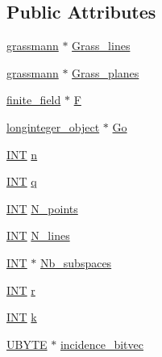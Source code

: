 \subsection*{Public Attributes}
\begin{DoxyCompactItemize}
\item 
\mbox{\hyperlink{classgrassmann}{grassmann}} $\ast$ \mbox{\hyperlink{classprojective__space_ae5cdf860890e6974499ce4ea7ed8bb77}{Grass\+\_\+lines}}
\item 
\mbox{\hyperlink{classgrassmann}{grassmann}} $\ast$ \mbox{\hyperlink{classprojective__space_add29014e44ba3a4066dc0405de11a5ad}{Grass\+\_\+planes}}
\item 
\mbox{\hyperlink{classfinite__field}{finite\+\_\+field}} $\ast$ \mbox{\hyperlink{classprojective__space_ab635000d4ce6ba131855377e4dce177d}{F}}
\item 
\mbox{\hyperlink{classlonginteger__object}{longinteger\+\_\+object}} $\ast$ \mbox{\hyperlink{classprojective__space_ae621b8c9021a20a04434d59eaabbb45f}{Go}}
\item 
\mbox{\hyperlink{galois_8h_a09fddde158a3a20bd2dcadb609de11dc}{I\+NT}} \mbox{\hyperlink{classprojective__space_abe307ea9427f119c2f054d85196e9655}{n}}
\item 
\mbox{\hyperlink{galois_8h_a09fddde158a3a20bd2dcadb609de11dc}{I\+NT}} \mbox{\hyperlink{classprojective__space_a2876762a0bcaa16ef28163969e0036c1}{q}}
\item 
\mbox{\hyperlink{galois_8h_a09fddde158a3a20bd2dcadb609de11dc}{I\+NT}} \mbox{\hyperlink{classprojective__space_afe5b5f945adfba43b22e5f0b1f6ae6ea}{N\+\_\+points}}
\item 
\mbox{\hyperlink{galois_8h_a09fddde158a3a20bd2dcadb609de11dc}{I\+NT}} \mbox{\hyperlink{classprojective__space_a7223b17e7c004e5259c49088ad5c2cbe}{N\+\_\+lines}}
\item 
\mbox{\hyperlink{galois_8h_a09fddde158a3a20bd2dcadb609de11dc}{I\+NT}} $\ast$ \mbox{\hyperlink{classprojective__space_a410bedca6f26e81d65e7e161d24dcbda}{Nb\+\_\+subspaces}}
\item 
\mbox{\hyperlink{galois_8h_a09fddde158a3a20bd2dcadb609de11dc}{I\+NT}} \mbox{\hyperlink{classprojective__space_a0da329ce9aa52977db526425b744544c}{r}}
\item 
\mbox{\hyperlink{galois_8h_a09fddde158a3a20bd2dcadb609de11dc}{I\+NT}} \mbox{\hyperlink{classprojective__space_a2221567d161ce39afe4c54584f99183c}{k}}
\item 
\mbox{\hyperlink{galois_8h_a122c4acf389c050379f00341fdcd5812}{U\+B\+Y\+TE}} $\ast$ \mbox{\hyperlink{classprojective__space_a2bed37a47350b0f958d1f099e2af6385}{incidence\+\_\+bitvec}}

\end{DoxyCompactItemize}
